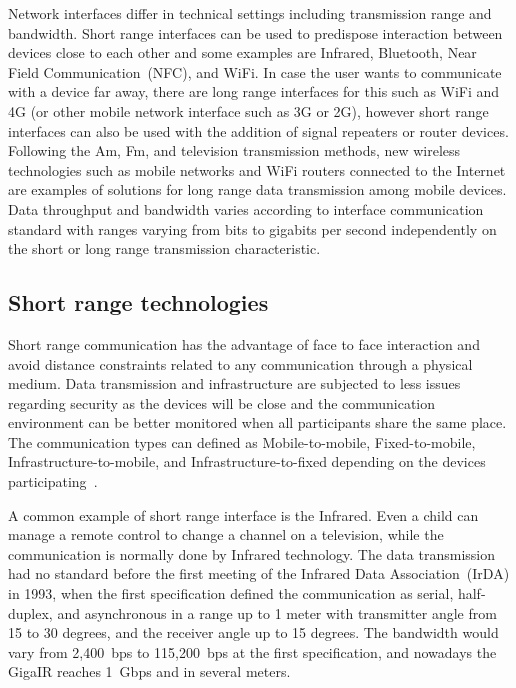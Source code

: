 Network interfaces differ in technical settings including transmission range and bandwidth.
Short range interfaces can be used to predispose interaction between devices close to each other and some examples are Infrared, Bluetooth, Near Field Communication~(NFC), and WiFi.
In case the user wants to communicate with a device far away, there are long range interfaces for this such as WiFi and 4G (or other mobile network interface such as 3G or 2G), however short range interfaces can also be used with the addition of signal repeaters or router devices.
Following the Am, Fm, and television transmission methods, new wireless technologies such as mobile networks and WiFi routers connected to the Internet are examples of solutions for long range data transmission among mobile devices.
Data throughput and bandwidth varies according to interface communication standard with ranges varying from bits to gigabits per second independently on the short or long range transmission characteristic.

\subsection*{Short range technologies} 

Short range communication has the advantage of face to face interaction and avoid distance constraints related to any communication through a physical medium.
Data transmission and infrastructure are subjected to less issues regarding security as the devices will be close and the communication environment can be better monitored when all participants share the same place.
The communication types can defined as Mobile-to-mobile, Fixed-to-mobile, Infrastructure-to-mobile, and Infrastructure-to-fixed depending on the devices participating~\citep{Deicke201optical}.

A common example of short range interface is the Infrared.
Even a child can manage a remote control to change a channel on a television, while the communication is normally done by Infrared technology.
The data transmission had no standard before the first meeting of the Infrared Data Association~(IrDA) in 1993, when the first specification defined the communication as serial, half-duplex, and asynchronous in a range up to 1 meter with transmitter angle from 15 to 30 degrees, and the receiver angle up to 15 degrees.
The bandwidth would vary from 2,400~bps to 115,200~bps at the first specification, and nowadays the GigaIR reaches 1~Gbps and in several meters.

